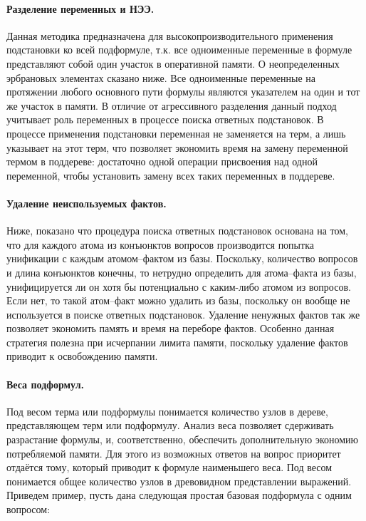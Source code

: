 \paragraph{Разделение переменных и НЭЭ.} Данная методика предназначена для высокопроизводительного применения подстановки ко всей подформуле, т.к. все одноименные переменные в формуле представляют собой один участок в оперативной памяти. О неопределенных эрбрановых элементах сказано ниже. Все одноименные переменные на протяжении любого основного пути формулы \cite{dissChe} являются указателем на один и тот же участок в памяти. В отличие от агрессивного разделения данный подход учитывает роль переменных в процессе поиска ответных подстановок. В процессе применения подстановки переменная не заменяется на терм, а лишь указывает на этот терм, что позволяет экономить время на замену переменной термом в поддереве: достаточно одной операции присвоения над одной переменной, чтобы установить замену всех таких переменных в поддереве.


\paragraph{Удаление неиспользуемых фактов.} Ниже, показано что процедура поиска ответных подстановок основана на том, что для каждого атома из конъюнктов вопросов производится попытка унификации с каждым атомом--фактом из базы. Поскольку, количество вопросов и длина конъюнктов конечны, то нетрудно определить для атома--факта из базы, унифицируется ли он хотя бы потенциально с каким-либо атомом из вопросов. Если нет, то такой атом--факт можно удалить из базы, поскольку он вообще не используется в поиске ответных подстановок. Удаление ненужных фактов так же позволяет экономить память и время на переборе фактов. Особенно данная стратегия полезна при исчерпании лимита памяти, поскольку удаление фактов приводит к освобождению памяти.

\paragraph{Веса подформул.} Под весом терма или подформулы понимается количество узлов в дереве, представляющем терм или подформулу. Анализ веса позволяет сдерживать разрастание формулы, и, соответственно, обеспечить дополнительную экономию потребляемой памяти. Для этого из возможных ответов на вопрос приоритет отдаётся тому, который приводит к формуле наименьшего веса. Под весом понимается общее количество узлов в древовидном представлении выражений. Приведем пример, пусть дана следующая простая базовая подформула с одним вопросом:

